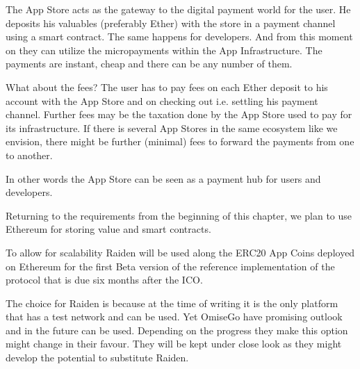 The App Store acts as the gateway to the digital payment world for the user. He deposits his valuables (preferably Ether) with the store in a payment channel using a smart contract. The same happens for developers. And from this moment on they can utilize the micropayments within the App Infrastructure. The payments are instant, cheap and there can be any number of them.

What about the fees? The user has to pay fees on each Ether deposit to his account with the App Store and on checking out i.e. settling his payment channel. Further fees may be the taxation done by the App Store used to pay for its infrastructure.  If there is several App Stores in the same ecosystem like we envision, there might be further (minimal) fees to forward the payments from one to another.

In other words the App Store can be seen as a payment hub for users and developers.

Returning to the requirements from the beginning of this chapter, we plan to use Ethereum for storing value and smart contracts. 

To allow for scalability Raiden will be used along the ERC20 App Coins deployed on Ethereum for the first Beta version of the reference implementation of the protocol that is due six months after the ICO. 

The choice for Raiden is because at the time of writing it is the only platform that has a test network and can be used. Yet OmiseGo have promising outlook and in the future can be used. Depending on the progress they make this option might change in their favour. They will be kept under close look as they might develop the potential to substitute Raiden.


